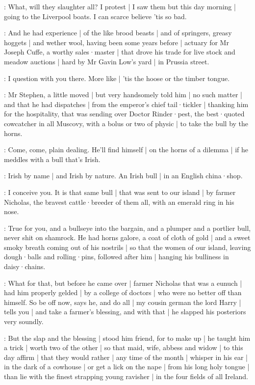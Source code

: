\Bloom:
What,
will they slaughter all?
I protest |
I saw them but this day morning |
going to the Liverpool boats.
I can scarce believe 'tis so bad.

:
And he had experience |
of the like brood beasts |
and of springers,
greasy hoggets |
and wether wool,
having been some years before |
actuary for Mr Joseph Cuffe,
a worthy sales·master |
that drove his trade for live stock and meadow auctions |
hard by Mr Gavin Low's yard |
in Prussia street.

\Bloom:
I question with you there.
More like |
'tis the hoose or the timber tongue.

:
Mr Stephen,
a little moved |
but very handsomely told him |
no such matter |
and that he had dispatches |
from the emperor's chief tail·tickler |
thanking him for the hospitality,
that was sending over Doctor Rinder·pest,
the best·quoted cowcatcher in all Muscovy,
with a bolus or two of physic |
to take the bull by the horns.

\lynch:
Come,
come,
plain dealing.
He'll find himself |
on the horns of a dilemma |
if he meddles with a bull that's Irish.

\stephen:
Irish by name |
and Irish by nature.
An Irish bull |
in an English china·shop.

\dixon:
I conceive you.
It is that same bull |
that was sent to our island |
by farmer Nicholas,
the bravest cattle·breeder of them all,
with an emerald ring in his nose.

\lynch:
True for you,
and a bullseye into the bargain,
and a plumper and a portlier bull,
never shit on shamrock.
He had horns galore,
a coat of cloth of gold |
and a sweet smoky breath coming out of his nostrils |
so that the women of our island,
leaving dough·balls and rolling·pins,
followed after him |
hanging his bulliness in daisy·chains.

\dixon:
What for that,
but before he came over |
farmer Nicholas that was a eunuch |
had him properly gelded |
by a college of doctors |
who were no better off than himself.
So be off now,
says he,
and do all |
my cousin german the lord Harry |
tells you |
and take a farmer's blessing,
and with that |
he slapped his posteriors very soundly.

\lynch:
But the slap and the blessing |
stood him friend,
for to make up |
he taught him a trick |
worth two of the other |
so that maid,
wife,
abbess and widow |
to this day affirm |
that they would rather |
any time of the month |
whisper in his ear |
in the dark of a cowhouse |
or get a lick on the nape |
from his long holy tongue |
than lie with the finest strapping young ravisher |
in the four fields of all Ireland.

